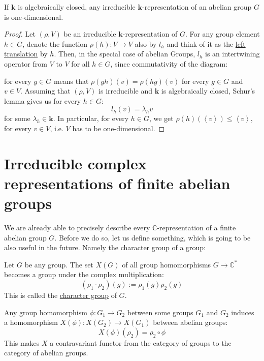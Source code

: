 \begin{proposition}\label{prop:one_dim}If $\mathbf{k}$ is algebraically closed, any irreducible $\mathbf{k}$-representation of an abelian group $G$ is one-dimensional.
\end{proposition}
\begin{proof} Let $(\rho,V)$ be an irreducible $\mathbf{k}$-representation of $G$. For any group element $h\in G$, denote the function $\rho(h):V\to V$ also by $l_h$ and think of it as the \ul{left translation} by $h$. Then, in the special case of abelian Groups, $l_h$ is an intertwining operator from $V$ to $V$ for all $h\in G$, since commutativity of the diagram:
\begin{center}
\end{center}
for every $g\in G$ means that $\rho(gh)(v)=\rho(hg)(v)$ for every $g\in G$ and $v\in V$. Assuming that $(\rho,V)$ is irreducible and $\mathbf{k}$ is algebraically closed, Schur's lemma gives us for every $h\in G$:
$$l_h(v)=\lambda_h v$$
for some $\lambda_h\in\mathbf{k}$. In particular, for every $h\in G$, we get $\rho(h)\left(\left<v\right>\right)\leq\left<v\right>$, for every $v\in V$, i.e. $V$ has to be one-dimensional.
\end{proof}

\section{Irreducible complex representations of finite abelian groups}
We are already able to precisely describe every $\mathbb{C}$-representation of a finite abelian group $G$. Before we do so, let us define something, which is going to be also useful in the future. Namely the character group of a group:

\begin{definition} Let $G$ be any group. The set $X(G)$ of all group homomorphisms $G\to\mathbb{C}^*$ becomes a group under the complex multiplication:
$$(\rho_1\cdot\rho_2)(g):=\rho_1(g)\rho_2(g)$$
This is called the \ul{character group} of $G$.
\end{definition}

\begin{remark} Any group homomorphism $\phi:G_1\to G_2$ between some groups $G_1$ and $G_2$ induces a homomorphism $X(\phi):X(G_2)\to X(G_1)$ between abelian groups:
$$X(\phi)(\rho_2)=\rho_2\circ\phi$$
This makes $X$ a contravariant functor from the category of groups to the category of abelian groups.
\end{remark}


